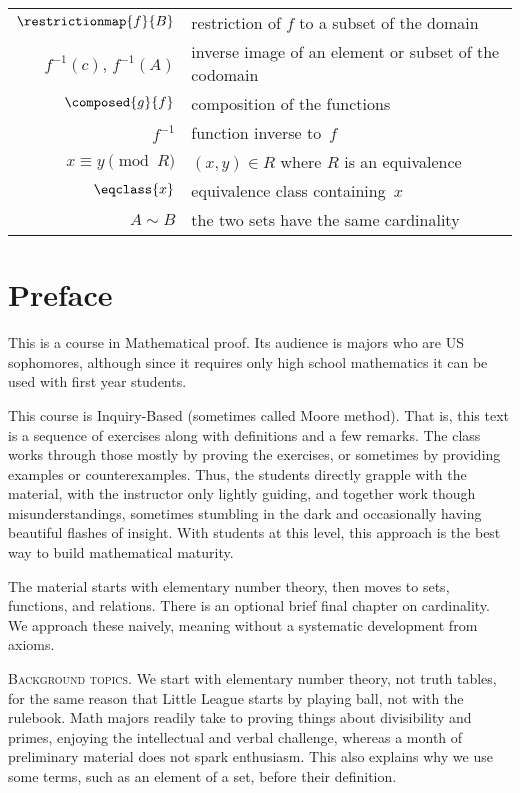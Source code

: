 \documentclass{ibl}
\begin{document}
\begin{center}
\begin{tabular}{r|l}
    $\restrictionmap{f}{B}$  &restriction of $f$ to a subset of the domain \\
    $f^{-1}(c)$, $f^{-1}(A)$  &inverse image of an element or subset of the codomain \\
    $\composed{g}{f}$  &composition of the functions  \\
    $f^{-1}$  &function inverse to~$f$  \\
    $x\equiv y\pmod R$  &$(x,y)\in R$ where $R$ is an equivalence \\ 
    $\eqclass{x}$  &equivalence class containing~$x$  \\
    $A\sim B$  &the two sets have the same cardinality
  \end{tabular}
\end{center}
\vspace*{\fill}





\chapter*{Preface}

This is a course in Mathematical proof. 
Its audience is majors who are US sophomores, although since
it requires only high school mathematics
it can be used with first year students.

This course is Inquiry-Based (sometimes called Moore method).
That is, this text is a sequence of exercises
along with definitions and a few 
remarks.
The class works through those mostly by
proving the exercises, or sometimes by providing examples or counterexamples.
Thus, the students directly grapple with the material, 
with the instructor only lightly guiding, 
and together work though misunderstandings, 
sometimes stumbling in the dark and occasionally
having beautiful flashes of insight.
With students at this level, 
this approach is the best way to build mathematical maturity.

The material starts with elementary number theory, 
then moves to sets, functions, and relations. 
There is an optional brief final chapter on cardinality.
We approach these naively, meaning without a systematic development from
axioms.


\medskip
\noindent\textsc{Background topics.}
We start with elementary number theory, not truth tables, 
for the same reason
that Little League starts by playing ball, not with the rulebook.
Math majors readily take to proving things about
divisibility and primes, enjoying the 
intellectual and verbal challenge, 
whereas a month of preliminary material does not 
spark enthusiasm.
This also explains why we use some terms, such as an element of a set, before
their definition.
\end{document}
